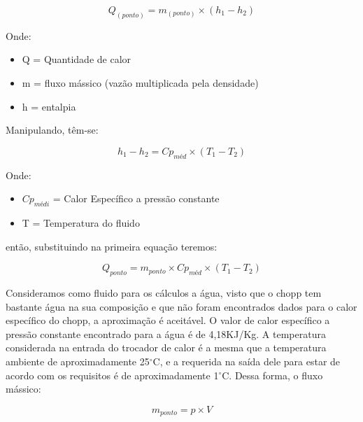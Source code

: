             \begin{equation}
                Q_{(ponto)} = m_{(ponto)} \times (h_1 - h_2)
            \end{equation}

            Onde:
            \begin{itemize}
                \item Q = Quantidade de calor
                \item m = fluxo mássico (vazão multiplicada pela densidade)
                \item h = entalpia
            \end{itemize}
            
            Manipulando, têm-se:

            \begin{equation}
                h_1 - h_2 = Cp_{méd} \times (T_1 - T_2)
            \end{equation}

            Onde:
            \begin{itemize}
                \item $Cp_{médi}$ = Calor Específico a pressão constante
                \item T = Temperatura do fluido
            \end{itemize}
            então, substituindo na primeira equação teremos:

            \begin{equation}
                Q_{ponto} = m_{ponto} \times Cp_{méd} \times (T_1 - T_2)
            \end{equation}

            Consideramos como fluido para os cálculos a água, visto que o chopp tem bastante 
            água na sua composição e que não foram encontrados dados para o calor específico 
            do chopp, a aproximação é aceitável. O valor de calor específico a pressão constante
            encontrado para a água é de 4,18KJ/Kg. A temperatura considerada na entrada do 
            trocador de calor é a mesma que a temperatura ambiente de aproximadamente 25$^\circ$C,
            e a requerida na saída dele para estar de acordo com os requisitos é de
            aproximadamente 1$^\circ$C. Dessa forma, o fluxo mássico:

            \begin{equation}
                m_{ponto} = p \times V
            \end{equation}

